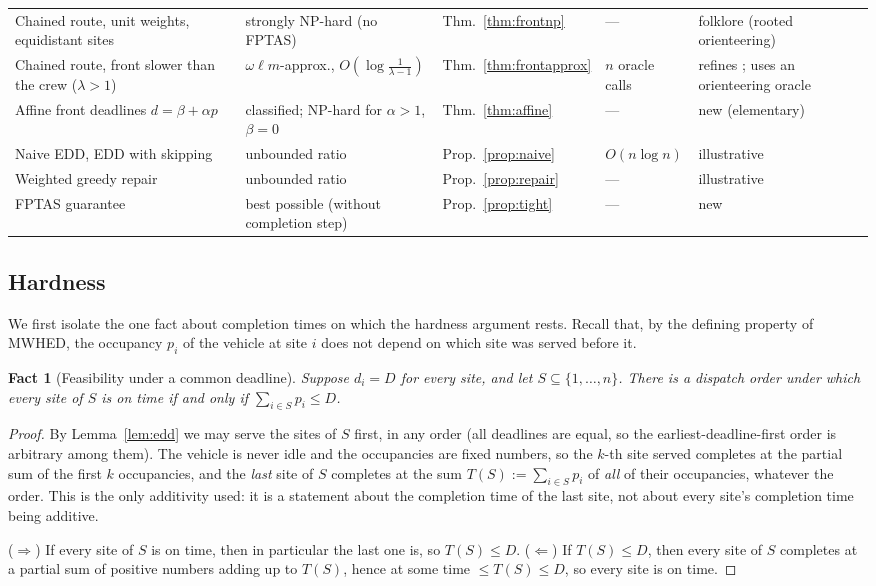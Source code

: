\documentclass[pdflatex,sn-mathphys-ay]{sn-jnl}
\theoremstyle{thmstyleone}
\newtheorem{fact}{Fact}
\theoremstyle{thmstyletwo}
\theoremstyle{thmstylethree}
\begin{document}
\begin{table}[h]
\begin{tabular}{@{}p{2.4cm}p{2.5cm}p{1.6cm}p{1.5cm}p{1.75cm}@{}}
Chained route, unit weights, equidistant sites & strongly NP-hard (no FPTAS) & Thm.~\ref{thm:frontnp} & --- & folklore (rooted orienteering) \\
Chained route, front slower than the crew ($\lambda>1$) & $\omega\ell m$-approx., $O(\log\frac1{\lambda-1})$ & Thm.~\ref{thm:frontapprox} & $n$ oracle calls & refines \citet{bansal2004}; uses an orienteering oracle \\
Affine front deadlines $d=\beta+\alpha p$ & classified; NP-hard for $\alpha>1$, $\beta=0$ & Thm.~\ref{thm:affine} & --- & new (elementary) \\
Naive EDD, EDD with skipping & unbounded ratio & Prop.~\ref{prop:naive} & $O(n\log n)$ & illustrative \\
Weighted greedy repair & unbounded ratio & Prop.~\ref{prop:repair} & --- & illustrative \\
FPTAS guarantee & best possible (without completion step) & Prop.~\ref{prop:tight} & --- & new \\
\bottomrule
\end{tabular}
\end{table}

\subsection{Hardness}

We first isolate the one fact about completion times on which the
hardness argument rests. Recall that, by the defining property of MWHED,
the occupancy $p_i$ of the vehicle at site $i$ does not depend on which
site was served before it.

\begin{fact}[Feasibility under a common deadline]\label{lem:common}
Suppose $d_i=D$ for every site, and let $S\subseteq\{1,\dots,n\}$. There
is a dispatch order under which every site of $S$ is on time if and only
if $\sum_{i\in S}p_i\le D$.
\end{fact}

\begin{proof}
By Lemma~\ref{lem:edd} we may serve the sites of $S$ first, in any order
(all deadlines are equal, so the earliest-deadline-first order is
arbitrary among them). The vehicle is never idle and the occupancies
are fixed numbers, so the $k$-th site served completes at the partial
sum of the first $k$ occupancies, and the \emph{last} site of $S$
completes at the sum $T(S):=\sum_{i\in S}p_i$ of \emph{all} of their
occupancies, whatever the order. This is the only additivity used: it is
a statement about the completion time of the last site, not about every
site's completion time being additive.

($\Rightarrow$) If every site of $S$ is on time, then in particular the
last one is, so $T(S)\le D$. ($\Leftarrow$) If $T(S)\le D$, then every
site of $S$ completes at a partial sum of positive numbers adding up to
$T(S)$, hence at some time $\le T(S)\le D$, so every site is on time.
\end{proof}
\end{document}
